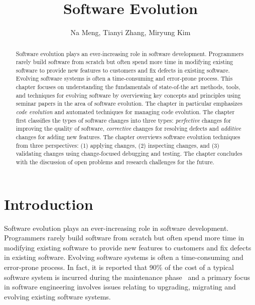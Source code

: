 \documentclass[runningheads,a4paper]{llncs}
\begin{document}
\mainmatter  %

\title{Software Evolution} 


%
%
\author{Na Meng, Tianyi Zhang, Miryung Kim} 



\maketitle


\begin{abstract}
	Software evolution plays an ever-increasing role in software development. Programmers rarely build software from scratch but often spend more time in modifying existing software to provide new features to customers and fix defects in existing software. Evolving software systems is often a time-consuming and error-prone process. This chapter focuses on understanding the fundamentals of state-of-the art methods, tools, and techniques for evolving software by overviewing key concepts and principles using seminar papers in the area of software evolution. The chapter in particular emphasizes {\em code evolution} and automated techniques for managing code evolution. The chapter first classifies the types of software changes into three types: {\em perfective} changes for improving the quality of software, {\em corrective} changes for resolving defects and {\em additive} changes for adding new features. The chapter overviews software evolution techniques from three perspectives: (1) applying changes, (2) inspecting changes, and (3) validating changes using change-focused debugging and testing. The chapter concludes with the discussion of open problems and research challenges for the future. 
\end{abstract}


\section{Introduction}
Software evolution plays an ever-increasing role in software development. Programmers rarely build software from scratch but often spend more time in modifying existing software to provide new features to customers and fix defects in existing software.  Evolving software systems is often a time-consuming and error-prone process. In fact, it is reported that 90\% of the cost of a typical software system is incurred during the maintenance phase~\cite{Madhavji2006} and a primary focus in software engineering involves issues relating to upgrading, migrating and evolving existing software systems. 
\end{document}
